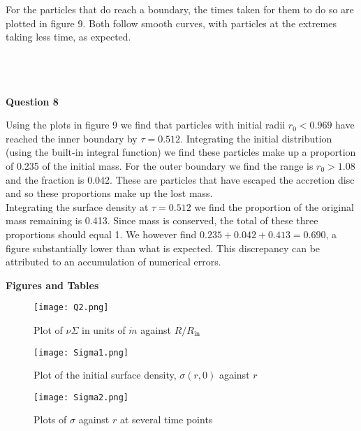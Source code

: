 \documentclass[12pt]{extarticle}
\begin{document}
For the particles that do reach a boundary, the times taken for them to do so are plotted in figure 9. Both follow smooth curves, with particles at the extremes taking less time, as expected.\\ \\ \\ \\

\begin{center}
\textbf{Question 8}
\end{center}

Using the plots in figure 9 we find that particles with initial radii $r_0 < 0.969$ have reached the inner boundary by $\tau = 0.512$. Integrating the initial distribution (using the built-in integral function) we find these particles make up a proportion of 0.235 of the initial mass. For the outer boundary we find the range is $r_0 > 1.08$ and the fraction is 0.042. These are particles that have escaped the accretion disc and so these proportions make up the lost mass.\\

Integrating the surface density at $\tau = 0.512$ we find the proportion of the original mass remaining is 0.413. Since mass is conserved, the total of these three proportions should equal 1. We however find $0.235+0.042+0.413 = 0.690$, a figure substantially lower than what is expected. This discrepancy can be attributed to an accumulation of numerical errors. 

\pagebreak 

\begin{center}
\textbf{Figures and Tables}
\end{center}

\begin{figure}[!htbp]
\centering
\texttt{[image: Q2.png]}
\caption{Plot of $\nu \Sigma$ in units of $\dot{m}$ against $R/R_{\mathrm{in}}$}
\label{figure:1}
\end{figure}

\begin{figure}[!htbp]
\centering
\texttt{[image: Sigma1.png]}
\caption{Plot of the initial surface density, $\sigma(r,0)$ against $r$}
\label{figure:2}
\end{figure}

\begin{figure}[!htbp]
\centering
\texttt{[image: Sigma2.png]}
\caption{Plots of $\sigma$ against $r$ at several time points}
\label{figure:3}
\end{figure}
\end{document}
